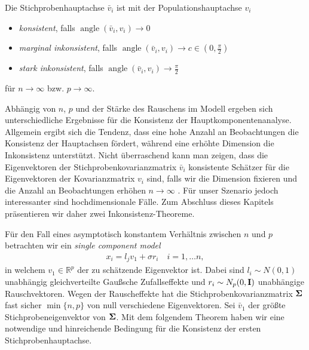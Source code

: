 \begin{defn}
Die Stichprobenhauptachse $\bar{v}_i$ ist mit der Populationshauptachse $v_i$
\begin{itemize}
\item \textit{konsistent}, falls $\operatorname{angle}(\bar{v}_i, v_i) \longrightarrow 0$
\item \textit{marginal inkonsistent}, falls $\operatorname{angle}(\bar{v}_i, v_i) \longrightarrow c \in (0,\frac{\pi}{2})$
\item \textit{stark inkonsistent}, falls $\operatorname{angle}(\bar{v}_i, v_i) \longrightarrow \frac{\pi}{2}$
\end{itemize} 
für $n \to \infty$ bzw. $p \rightarrow \infty$. 
\end{defn}

Abhängig von $n$, $p$ und der Stärke des Rauschens im Modell ergeben sich unterschiedliche Ergebnisse für die Konsistenz der Hauptkomponentenanalyse. Allgemein ergibt sich die Tendenz, dass eine hohe Anzahl an Beobachtungen die Konsistenz der Hauptachsen fördert, während eine erhöhte Dimension die Inkonsistenz unterstützt. Nicht überraschend kann man zeigen, dass die Eigenvektoren der Stichprobenkovarianzmatrix $\bar{v}_i$ konsistente Schätzer für die Eigenvektoren der Kovarianzmatrix $v_i$ sind, falls wir die Dimension fixieren und die Anzahl an Beobachtungen erhöhen $n \rightarrow \infty$ \cite{anderson}. Für unser Szenario jedoch interessanter sind hochdimensionale Fälle. Zum Abschluss dieses Kapitels präsentieren wir daher zwei Inkonsistenz-Theoreme.

Für den Fall eines asymptotisch konstantem Verhältnis zwischen $n$ und $p$ betrachten wir ein \textit{single component model} \cite{johnstone}
\begin{align}
\label{single_component_model}
x_i = l_j v_1 + \sigma r_i \quad i = 1, \ldots n,
\end{align}
in welchem $v_1 \in \mathbb{R}^p$ der zu schätzende Eigenvektor ist. Dabei sind $l_i \sim N(0,1)$ unabhängig gleichverteilte Gaußsche Zufallseffekte und $r_i \sim N_p(0, \mathbf{I})$ unabhängige Rauschvektoren. Wegen der Rauscheffekte hat die Stichprobenkovarianzmatrix $\mathbf{\Sigma}$ fast sicher $\min\{n,p\}$ von null verschiedene Eigenvektoren. Sei $\bar{v}_1$ der größte Stichprobeneigenvektor von $\mathbf{\Sigma}$. Mit dem folgendem Theorem haben wir eine notwendige und hinreichende Bedingung für die Konsistenz der ersten Stichprobenhauptachse.

